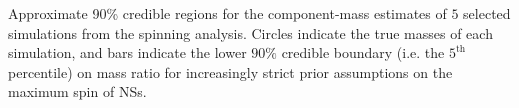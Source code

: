 \label{fig:comp_masses} Approximate 90\% credible regions for the component-mass estimates of $5$ selected simulations from the spinning analysis.  Circles indicate the true masses of each simulation, and bars indicate the lower $90\%$ credible boundary (i.e. the $5^\mathrm{th}$ percentile) on mass ratio for increasingly strict prior assumptions on the maximum spin of NSs.
  
  